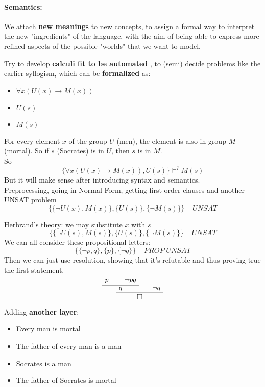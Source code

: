 \paragraph{Semantics:} We attach \textbf{new meanings} to new concepts, to assign a formal way to interpret the new "ingredients" of the language, with the aim of being able to express more refined aspects of the possible "worlds" that we want to model.\\

\newpage

Try to develop \textbf{calculi fit to be automated} , to (semi) decide problems like the earlier syllogism, which can be \textbf{formalized} as:
\begin{itemize}
	\item $\forall x (U(x) \rightarrow M(x))$
	\item $U(s)$
	 \\ \bline
	\item $M(s)$
\end{itemize}
For every element $x$ of the group $U$ (men), the element is also in group $M$ (mortal). So if $s$ (Socrates) is in $U$, then $s$ is in $M$.\\

So 
$$ \{\forall x (U(x) \rightarrow M(x)), U(s)\} \models^? M(s) $$
But it will make sense after introducing syntax and semantics.\\

Preprocessing, going in Normal Form, getting first-order clauses and another UNSAT problem
$$ \{ \{\neg U(x), M(x)\}, \{U(s)\}, \{\neg M(s)\} \} \;\;\;\; UNSAT $$

Herbrand's theory: we may substitute $x$ with $s$ 
$$ \{ \{\neg U(s), M(s)\}, \{U(s)\}, \{\neg M(s)\} \} \;\;\;\; UNSAT $$
We can all consider these propositional letters:
$$ \{\{\neg p, q\}, \{p\}, \{\neg q\}\} \;\;\;\; PROP \; UNSAT $$
Then we can just use resolution, showing that it's refutable and thus proving true the first statement.
$$
\AxiomC{$p$}
\AxiomC{$\neg p q$}
\BinaryInfC{$q$}
\AxiomC{$\neg q$}
\BinaryInfC{$\square$}
\DisplayProof
$$

\newpage

Adding \textbf{another layer}:
\begin{itemize}
	\item Every man is mortal 
	\item The father of every man is a man
	\item Socrates is a man
	\\ \bline
	\item The father of Socrates is mortal
\end{itemize}

